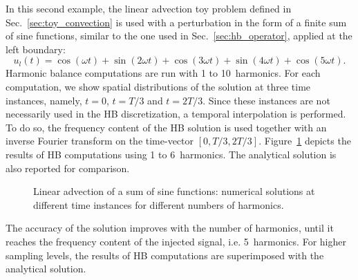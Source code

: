 
In this second example, the linear advection toy problem 
defined in Sec.~\ref{sec:toy_convection} is used with
a perturbation 
in the form of a finite sum of sine functions, similar to the one used
in Sec.~\ref{sec:hb_operator},
applied at the left boundary:
\begin{equation}
    u_l(t) = \cos(\omega t) + \sin(2 \omega t) +
    \cos(3 \omega t) + \sin(4 \omega t) + \cos(5 \omega t).
    \label{eq:sum_injected_fct}
\end{equation}
Harmonic balance computations are run with 1 to 10~harmonics.
For each computation, we show spatial distributions of the solution
at three time instances, namely, $t=0$, $t=T/3$ and $t=2T/3$.
Since these instances are not necessarily used in the HB discretization,
a temporal interpolation is performed.
To do so, the frequency content of the HB solution is used
together with an inverse Fourier transform on the time-vector
$[0, T/3, 2T/3]$.
Figure~\ref{fig:inj_sine_results} depicts the results of HB computations
using 1 to 6~harmonics. The analytical solution is also reported for comparison.

\begin{figure}
  \centering
  \caption{Linear advection of a sum of sine functions: 
  numerical solutions at different time instances for different numbers of harmonics.}
  \label{fig:inj_sine_results}
\end{figure}

The accuracy of the solution 
improves with the number of harmonics,
until it reaches the frequency content
of the injected signal, i.e. 5~harmonics.
For higher sampling levels, the results of HB computations are
superimposed with the analytical solution. 

